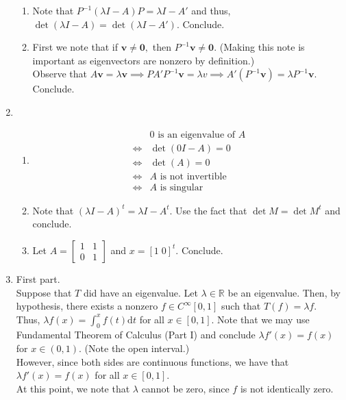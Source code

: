 \documentclass{article}
\begin{document}
\begin{enumerate}
	\begin{enumerate} 
		\item Note that $P^{-1}(\lambda I - A)P = \lambda I - A'$ and thus, $\det(\lambda I - A) = \det(\lambda I - A').$ Conclude.
		\item First we note that if $\mathbf{v} \neq \mathbf{0},$ then $P^{-1}\mathbf{v} \neq \mathbf{0}.$ (Making this note is important as eigenvectors are nonzero by definition.)\\
		Observe that $A\mathbf{v} = \lambda\mathbf{v} \implies PA'P^{-1}\mathbf{v} = \lambda v \implies A'(P^{-1}\mathbf{v}) = \lambda P^{-1}\mathbf{v}.$\\
		Conclude.
	\end{enumerate}
	\item 
	\begin{enumerate} 
		\item \begin{align*} 
			&0 \text{ is an eigenvalue of }A\\
			\iff &\det(0I - A) = 0\\
			\iff &\det(A) = 0\\
			\iff &A \text{ is not invertible}\\
			\iff &A \text{ is singular}
		\end{align*}
		\item Note that $(\lambda I - A)^t = \lambda I - A^t.$ Use the fact that $\det M = \det M^t$ and conclude.
		\item Let $A = \begin{bmatrix}
			1 & 1\\
			0 & 1
		\end{bmatrix}$ and $x = [1 \; 0]^t.$ Conclude.
	\end{enumerate}
	\item First part.\\
	Suppose that $T$ did have an eigenvalue. Let $\lambda \in \mathbb{R}$ be an eigenvalue. Then, by hypothesis, there exists a nonzero $f \in C^\infty[0, 1]$ such that $T(f) = \lambda f.$ \\
	Thus, $\lambda f(x) = \displaystyle\int_{0}^{x} f(t) \text{d}t$ for all $x \in [0, 1].$ Note that we may use Fundamental Theorem of Calculus (Part I) and conclude $\lambda f'(x) = f(x)$ for $x \in (0, 1).$ (Note the open interval.)\\
	However, since both sides are continuous functions, we have that $\lambda f'(x) = f(x)$ for all $x \in [0, 1].$\\
	At this point, we note that $\lambda$ cannot be zero, since $f$ is not identically zero.\\

\end{enumerate}
\end{document}

